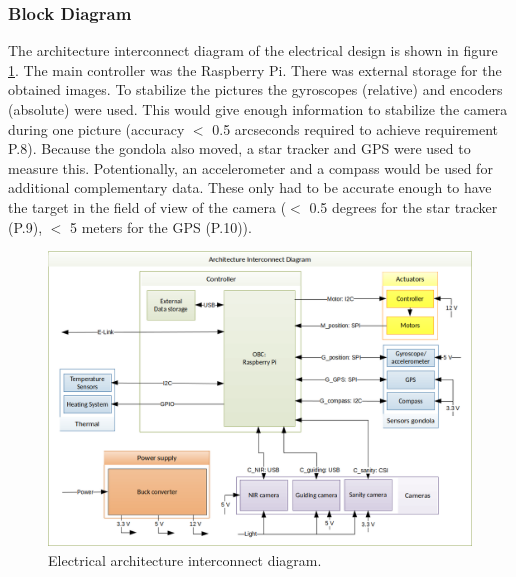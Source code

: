 \subsubsection{Block Diagram}
\label{sec:4.5.1}
The architecture interconnect diagram of the electrical design is shown in figure \ref{fig:elec-AID}. The main controller was the Raspberry Pi. There was external storage for the obtained images. To stabilize the pictures the gyroscopes (relative) and encoders (absolute) were used. This would give enough information to stabilize the camera during one picture (accuracy $<$ 0.5 arcseconds required to achieve requirement P.8). Because the gondola also moved, a star tracker and GPS were used to measure this. Potentionally, an accelerometer and a compass would be used for additional complementary data. These only had to be accurate enough to have the target in the field of view of the camera ($<$ 0.5 degrees for the star tracker (P.9), $<$ 5 meters for the GPS (P.10)).
\vspace{-.5cm}
\begin{figure}[H]
	\centering
	\includegraphics[width=.85\textwidth]{4-experiment-design/img/electrical/ArchitectureInterconnect.png}
	\caption{Electrical architecture interconnect diagram.}
	\label{fig:elec-AID}
\end{figure}


